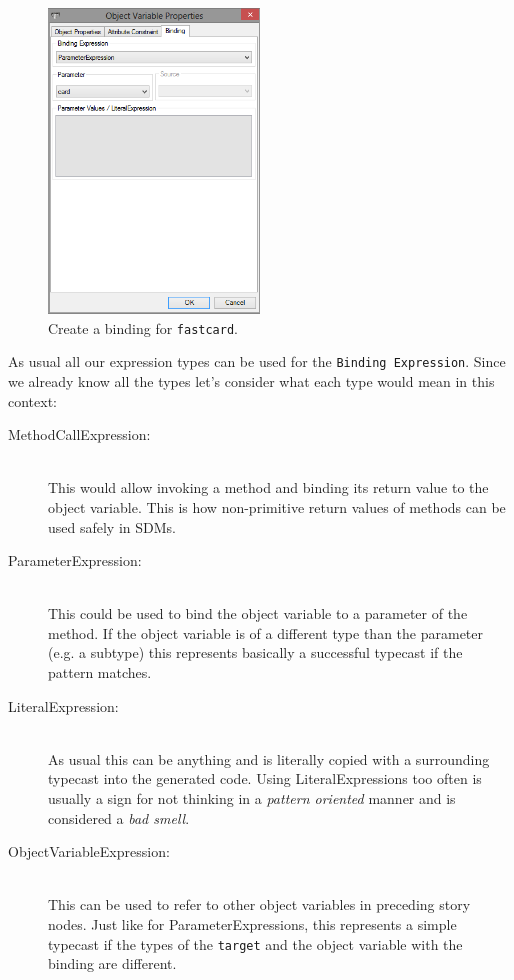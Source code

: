 \begin{figure}[htbp]
\begin{center}
  \includegraphics[width=0.5\textwidth]{pics/sdmBilder/bindings/fastcard_bindingexp.png}
  \caption{Create a binding for \texttt{fastcard}.}  
  \label{fig:sdm_fastcard_3}
\end{center}
\end{figure}

As usual all our expression types can be used for the \texttt{Binding
Expression}.  Since we already know all the types let's consider what each type
would mean in this context: 
\begin{description}
  \item[MethodCallExpression:]~\\ This would allow invoking a method and binding
  its return value to the object variable.  This is how non-primitive return
  values of methods can be used safely in SDMs.
  \item[ParameterExpression:]~\\ This could be used to bind the object variable
  to a parameter of the method.  If the object variable is of a different type
  than the parameter (e.g. a subtype) this represents basically a successful
  typecast if the pattern matches.
  \item[LiteralExpression:]~\\ As usual this can be anything and is literally
  copied with a surrounding typecast into the generated code.  Using
  LiteralExpressions too often is usually a sign for not thinking in a
  \emph{pattern oriented} manner and is considered a \emph{bad smell}.
  \item[ObjectVariableExpression:]~\\ This can be used to refer to other object
  variables in preceding story nodes.  Just like for ParameterExpressions, this
  represents a simple typecast if the types of the \texttt{target} and the
  object variable with the binding are different.
\end{description}

